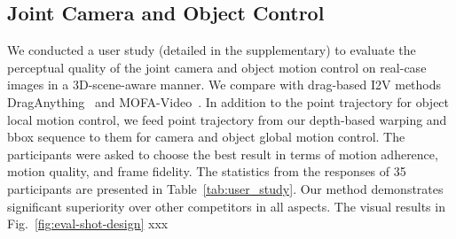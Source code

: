 





\subsection{Joint Camera and Object Control}






We conducted a user study (detailed in the supplementary) to evaluate the perceptual quality of the joint camera and object motion control on real-case images in a 3D-scene-aware manner. We compare with drag-based I2V methods DragAnything~\cite{wu2025draganything} and MOFA-Video~\cite{niu2025mofa}. In addition to the point trajectory for object local motion control, we feed point trajectory from our depth-based warping and bbox sequence to them for camera and object global motion control. The participants were asked to choose the best result in terms of motion adherence, motion quality, and frame fidelity. The statistics from the responses of 35 participants are presented in Table~\ref{tab:user_study}. Our method demonstrates significant superiority over other competitors in all aspects. The visual results in Fig.~\ref{fig:eval-shot-design} xxx



